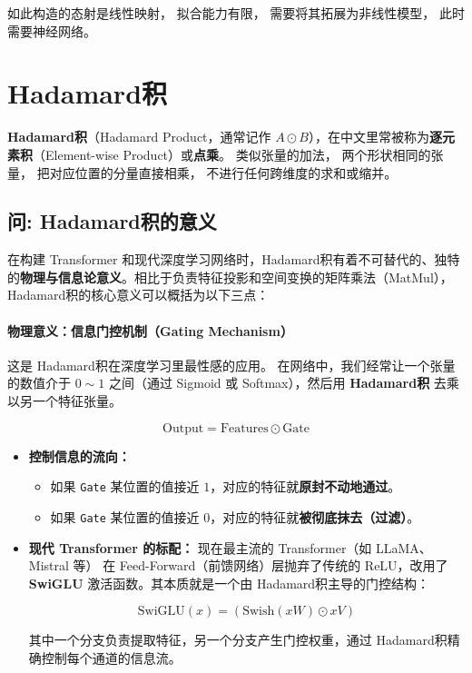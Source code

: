 \documentclass[10pt,a4paper]{article}
\begin{document}
如此构造的态射是线性映射，
拟合能力有限，
需要将其拓展为非线性模型，
此时需要神经网络。

\section{Hadamard积}

\textbf{Hadamard积}\cite{Hadamard1893}（Hadamard Product，通常记作 $A \odot B$），在中文里常被称为\textbf{逐元素积}（Element-wise Product）或\textbf{点乘}。
类似张量的加法，
两个形状相同的张量，
把对应位置的分量直接相乘，
不进行任何跨维度的求和或缩并。

\subsection{问: Hadamard积的意义}

在构建 Transformer\cite{Vaswani2017Attention} 和现代深度学习网络时，Hadamard积有着不可替代的、独特的\textbf{物理与信息论意义}。相比于负责特征投影和空间变换的矩阵乘法（MatMul），Hadamard积的核心意义可以概括为以下三点：

\paragraph{物理意义：信息门控机制（Gating Mechanism）}

这是 Hadamard积在深度学习里最性感的应用。
在网络中，我们经常让一个张量的数值介于 $0 \sim 1$ 之间（通过 Sigmoid 或 Softmax），然后用 \textbf{Hadamard积} 去乘以另一个特征张量。

\[
\text{Output} = \text{Features} \odot \text{Gate}
\]

\begin{itemize}
\item \textbf{控制信息的流向：}
  \begin{itemize}
  \item 如果 \texttt{Gate} 某位置的值接近 $1$，对应的特征就\textbf{原封不动地通过}。
  \item 如果 \texttt{Gate} 某位置的值接近 $0$，对应的特征就\textbf{被彻底抹去（过滤）}。
  \end{itemize}

\item \textbf{现代 Transformer 的标配：}
现在最主流的 Transformer（如 LLaMA、Mistral 等）\cite{Touvron2023LLaMA} 在 Feed-Forward（前馈网络）层抛弃了传统的 ReLU，改用了 \textbf{SwiGLU}\cite{Shazeer2020GLU} 激活函数。其本质就是一个由 Hadamard积主导的门控结构：

\[
\text{SwiGLU}(x) = (\text{Swish}(xW) \odot xV)
\]

其中一个分支负责提取特征，另一个分支产生门控权重，通过 Hadamard积精确控制每个通道的信息流。
\end{itemize}
\end{document}
